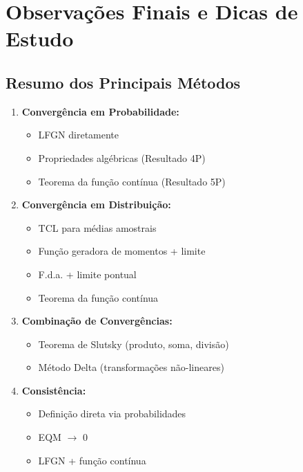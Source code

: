 \documentclass[12pt,a4paper]{article}
\theoremstyle{definition}
\theoremstyle{remark}
\begin{document}
\section{Observações Finais e Dicas de Estudo}

\subsection{Resumo dos Principais Métodos}

\begin{enumerate}
    \item \textbf{Convergência em Probabilidade:}
    \begin{itemize}
        \item LFGN diretamente
        \item Propriedades algébricas (Resultado 4P)
        \item Teorema da função contínua (Resultado 5P)
    \end{itemize}
    
    \item \textbf{Convergência em Distribuição:}
    \begin{itemize}
        \item TCL para médias amostrais
        \item Função geradora de momentos + limite
        \item F.d.a. + limite pontual
        \item Teorema da função contínua
    \end{itemize}
    
    \item \textbf{Combinação de Convergências:}
    \begin{itemize}
        \item Teorema de Slutsky (produto, soma, divisão)
        \item Método Delta (transformações não-lineares)
    \end{itemize}
    
    \item \textbf{Consistência:}
    \begin{itemize}
        \item Definição direta via probabilidades
        \item EQM $\to$ 0
        \item LFGN + função contínua
    \end{itemize}
\end{enumerate}
\end{document}
